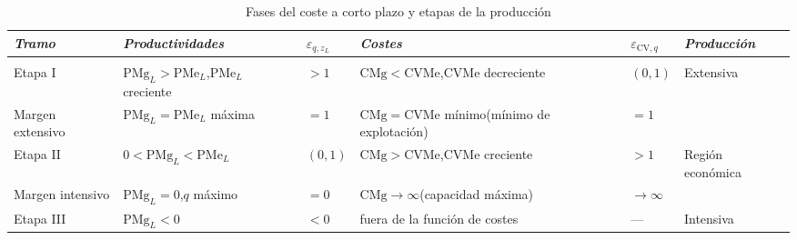 \documentclass[11pt]{article}
\begin{document}
\begin{table}[H]
\centering\small
\caption{Fases del coste a corto plazo y etapas de la producción}\label{tab:fases-coste}
\renewcommand{\arraystretch}{1.3}
\begin{tabular}{|>{\centering\arraybackslash}m{}|>{\centering\arraybackslash}m{}|>{\centering\arraybackslash}m{}|>{\centering\arraybackslash}m{}|>{\centering\arraybackslash}m{}|>{\centering\arraybackslash}m{}|}
\hline
\rowcolor{tceeazulpalido}\textit{Tramo} & \textit{Productividades} & \textit{$\varepsilon_{q,z_L}$} & \textit{Costes} & \textit{$\varepsilon_{\mathrm{CV},q}$} & \textit{Producción} \\
\hline
\multicolumn{6}{|c|}{\cellcolor{tceesalvia}$\varepsilon_{\mathrm{CV},q}=\mathrm{CMg}/\mathrm{CVMe}=\mathrm{PMe}_L/\mathrm{PMg}_L=1/\varepsilon_{q,z_L}$}\\
\hline
\textcolor{tceenaranja}{Etapa I} & $\mathrm{PMg}_L>\mathrm{PMe}_L$,\newline $\mathrm{PMe}_L$ creciente & $>1$ & $\mathrm{CMg}<\mathrm{CVMe}$,\newline CVMe decreciente & $(0,1)$ & \textcolor{tceenaranja}{Extensiva} \\
\hline
Margen extensivo & $\mathrm{PMg}_L=\mathrm{PMe}_L$ máxima & $=1$ & $\mathrm{CMg}=\mathrm{CVMe}$ mínimo\newline (mínimo de explotación) & $=1$ & \\
\hline
\textcolor{tceeverde}{Etapa II} & $0<\mathrm{PMg}_L<\mathrm{PMe}_L$ & $(0,1)$ & $\mathrm{CMg}>\mathrm{CVMe}$,\newline CVMe creciente & $>1$ & \textcolor{tceeverde}{Región económica} \\
\hline
Margen intensivo & $\mathrm{PMg}_L=0$,\newline $q$ máximo & $=0$ & $\mathrm{CMg}\to\infty$\newline (capacidad máxima) & $\to\infty$ & \\
\hline
\textcolor{tceerojo}{Etapa III} & $\mathrm{PMg}_L<0$ & $<0$ & fuera de la función de costes & --- & \textcolor{tceerojo}{Intensiva} \\
\hline
\end{tabular}
\par{}
\end{table}
\end{document}
